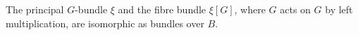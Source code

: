 The principal $G$-bundle $\xi$ and the fibre bundle $\xi[G]$, where $G$ acts on $G$ by left multiplication, are isomorphic as bundles over $B$.
